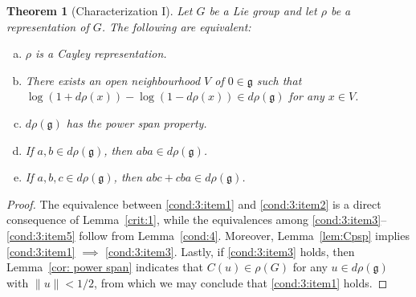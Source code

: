 \documentclass[11pt,reqno]{amsart}
\newtheorem{theorem}{Theorem}[section]
\begin{document}
\begin{theorem}[Characterization I]\label{cond:3}
Let $G$ be a Lie group and let $\rho$ be a representation of $G$.  The following are equivalent:
\begin{enumerate}[(a)]
\item $\rho$ is a Cayley representation. \label{cond:3:item1}
\item There exists an open neighbourhood $V$ of $0 \in \mathfrak{g}$ such that $\log(1 + d\rho(x)) - \log(1 - d \rho(x)) \in d\rho (\mathfrak{g})$ for any $x \in V$. \label{cond:3:item2}
\item $d\rho(\mathfrak{g})$ has the power span property.  \label{cond:3:item3}
\item If $a, b \in  d\rho(\mathfrak{g})$,  then $aba\in  d\rho(\mathfrak{g})$.  \label{cond:3:item4}
\item If $a, b, c \in d\rho(\mathfrak{g})$,  then $abc + cba\in  d\rho(\mathfrak{g})$. \label{cond:3:item5}
\end{enumerate}
\end{theorem}
\begin{proof}
The equivalence between \eqref{cond:3:item1} and \eqref{cond:3:item2} is a direct consequence of Lemma~\ref{crit:1},  while the equivalences among \eqref{cond:3:item3}--\eqref{cond:3:item5} follow from Lemma~\ref{cond:4}.  Moreover,  Lemma~\ref{lem:Cpsp} implies \eqref{cond:3:item1} $\implies$ \eqref{cond:3:item3}.  Lastly,  if \eqref{cond:3:item3} holds,  then Lemma~\ref{cor: power span} indicates that $C(u) \in \rho(G)$  for any $u\in d\rho(\mathfrak{g})$ with $\lVert u \rVert < 1/2$,  from which we may conclude that \eqref{cond:3:item1} holds.
\end{proof}
\end{document}
